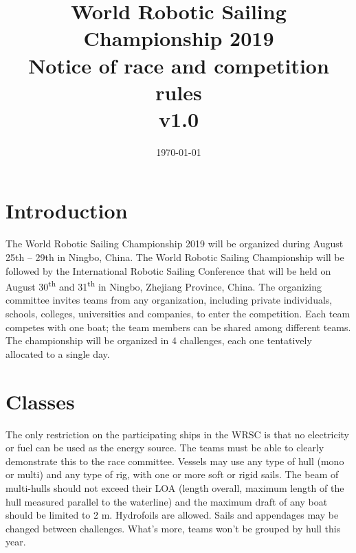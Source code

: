 \documentclass[12pt]{article}
\title{World Robotic Sailing Championship 2019 \\
Notice of race and competition rules \\v1.0}
\date{\today}
\begin{document}
\maketitle

\section{Introduction}

The World Robotic Sailing Championship 2019 will be organized during August 25th – 29th in Ningbo, China.
The World Robotic Sailing Championship will be followed by the International Robotic Sailing Conference that will be held on August 30\textsuperscript{th} and 31\textsuperscript{th} in Ningbo, Zhejiang Province, China.
The organizing committee invites teams from any organization, including private individuals, schools, colleges, universities and companies, to enter the competition.
Each team competes with one boat; the team members can be shared among different teams.
The championship will be organized in 4 challenges, each one tentatively allocated to a single day. 


\section{Classes}

The only restriction on the participating ships in the WRSC is that no electricity or fuel can be used as the energy source.
The teams must be able to clearly demonstrate this to the race committee.
Vessels may use any type of hull (mono or multi) and any type of rig, with one or more soft or rigid sails.
The beam of multi-hulls should not exceed their LOA (length overall, maximum length of the hull measured parallel to the waterline) and the maximum draft of any boat should be limited to 2 m.
Hydrofoils are allowed. 
Sails and appendages may be changed between challenges. 
What’s more, teams won’t be grouped by hull this year.
\end{document}
